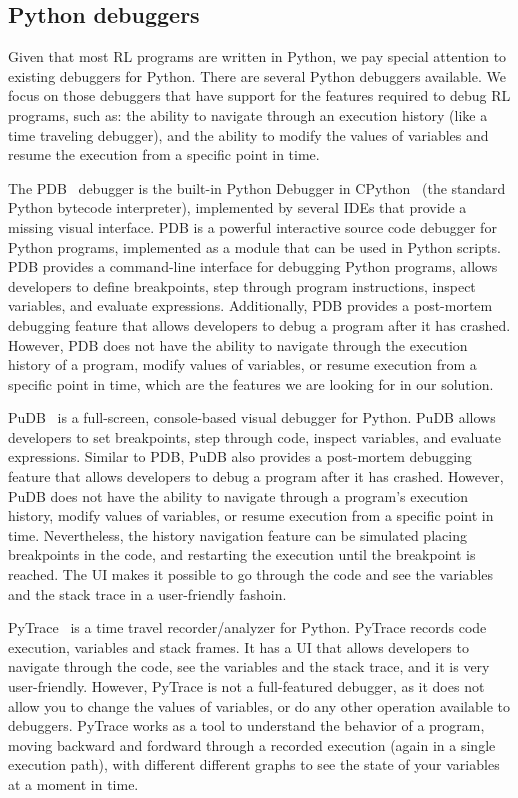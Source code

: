 \subsection{Python debuggers}
\label{sec:py}

Given that  most \ac{RL} programs are written in Python, we pay special attention to existing 
debuggers for Python. There are several Python debuggers available. We focus on those debuggers
that have support for the features required to debug \ac{RL} programs, such as: the ability to navigate 
through an execution history (like a time traveling debugger), and the ability to modify the values
of variables and resume the execution from a specific point in time.

The \ac{PDB}~\cite{python-pdb} debugger is the built-in Python Debugger in CPython~\cite{shaw21} 
(the standard Python bytecode interpreter), implemented by several IDEs that provide a missing 
visual interface. \ac{PDB} is a powerful interactive source code debugger for Python programs, 
implemented as a module that can be used in Python scripts. \ac{PDB} provides a command-line 
interface for debugging Python programs, allows developers to define breakpoints, step through 
program instructions, inspect variables, and evaluate expressions. Additionally, \ac{PDB} provides 
a post-mortem debugging feature that allows developers to debug a program after it has crashed. 
However, \ac{PDB} does not have the ability to navigate through the execution history of a program, 
modify values of variables, or resume execution from a specific point in time, which are the features 
we are looking for in our solution. 

PuDB~\cite{pudb} is a full-screen, console-based visual debugger for Python. PuDB allows 
developers to set breakpoints, step through code, inspect variables, and evaluate expressions. 
Similar to \ac{PDB}, PuDB also provides a post-mortem debugging feature that allows developers to 
debug a program after it has crashed. However, PuDB does not have the ability to navigate through 
a program's execution history, modify values of variables, or resume execution from a specific point 
in time. Nevertheless, the history navigation feature can be simulated placing breakpoints in the 
code, and restarting the execution until the breakpoint is reached. The UI makes it possible to go 
through the code and see the variables and the stack trace in a user-friendly fashoin.

PyTrace~\cite{pytrace} is a time travel recorder/analyzer for Python. PyTrace records code execution, 
variables and stack frames. It has a UI that allows developers to navigate through the code, 
see the variables and the stack trace, and it is very user-friendly. However, PyTrace is not 
a full-featured debugger, as it does not allow you to change the values of variables, or do 
any other operation available to debuggers. PyTrace works as a tool to understand the behavior of 
a program, moving backward and fordward through a recorded execution (again in a single execution 
path),  with different different graphs to see the state of your variables at a moment in time.

